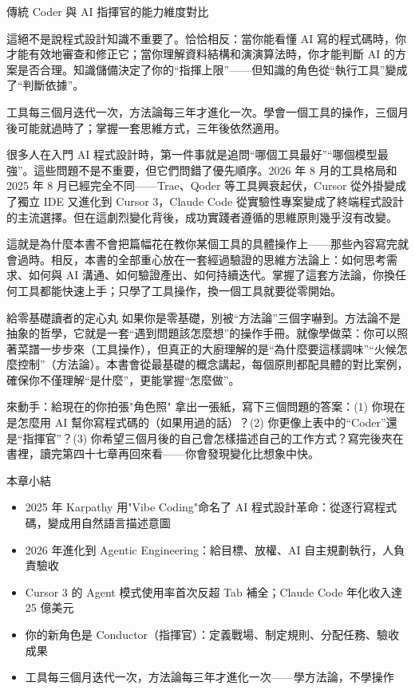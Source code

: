 \begin{center}\small\color{gray}傳統 Coder 與 AI 指揮官的能力維度對比\end{center}

這絕不是說程式設計知識不重要了。恰恰相反：當你能看懂 AI 寫的程式碼時，你才能有效地審查和修正它；當你理解資料結構和演演算法時，你才能判斷 AI 的方案是否合理。知識儲備決定了你的“指揮上限”——但知識的角色從“執行工具”變成了“判斷依據”。


工具每三個月迭代一次，方法論每三年才進化一次。學會一個工具的操作，三個月後可能就過時了；掌握一套思維方式，三年後依然適用。

很多人在入門 AI 程式設計時，第一件事就是追問“哪個工具最好”“哪個模型最強”。這些問題不是不重要，但它們問錯了優先順序。2026 年 8 月的工具格局和 2025 年 8 月已經完全不同——Trae、Qoder 等工具興衰起伏，Cursor 從外掛變成了獨立 IDE 又進化到 Cursor 3，Claude Code 從實驗性專案變成了終端程式設計的主流選擇。但在這劇烈變化背後，成功實踐者遵循的思維原則幾乎沒有改變。

這就是為什麼本書不會把篇幅花在教你某個工具的具體操作上——那些內容寫完就會過時。相反，本書的全部重心放在一套經過驗證的思維方法論上：如何思考需求、如何與 AI 溝通、如何驗證產出、如何持續迭代。掌握了這套方法論，你換任何工具都能快速上手；只學了工具操作，換一個工具就要從零開始。

\begin{tcbinfo}{給零基礎讀者的定心丸}
如果你是零基礎，別被“方法論”三個字嚇到。方法論不是抽象的哲學，它就是一套“遇到問題該怎麼想”的操作手冊。就像學做菜：你可以照著菜譜一步步來（工具操作），但真正的大廚理解的是“為什麼要這樣調味”“火候怎麼控制”（方法論）。本書會從最基礎的概念講起，每個原則都配具體的對比案例，確保你不僅理解“是什麼”，更能掌握“怎麼做”。

\end{tcbinfo}

\begin{tcbpractice}{來動手：給現在的你拍張"角色照"}
拿出一張紙，寫下三個問題的答案：(1) 你現在是怎麼用 AI 幫你寫程式碼的（如果用過的話）？(2) 你更像上表中的“Coder”還是“指揮官”？(3) 你希望三個月後的自己會怎樣描述自己的工作方式？寫完後夾在書裡，讀完第四十七章再回來看——你會發現變化比想象中快。

\end{tcbpractice}

\begin{tcbsummary}{本章小結}
\begin{itemize}
  \item 2025 年 Karpathy 用"Vibe Coding"命名了 AI 程式設計革命：從逐行寫程式碼，變成用自然語言描述意圖
  \item 2026 年進化到 Agentic Engineering：給目標、放權、AI 自主規劃執行，人負責驗收
  \item Cursor 3 的 Agent 模式使用率首次反超 Tab 補全；Claude Code 年化收入達 25 億美元
  \item 你的新角色是 Conductor（指揮官）：定義戰場、制定規則、分配任務、驗收成果
  \item 工具每三個月迭代一次，方法論每三年才進化一次——學方法論，不學操作
\end{itemize}

\end{tcbsummary}
